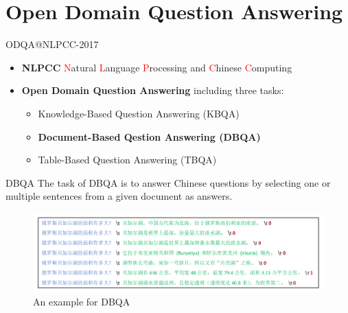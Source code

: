 \documentclass{beamer}
\begin{document}
  \section{Open Domain Question Answering}
  \begin{frame}{ODQA@NLPCC-2017}
    \begin{itemize}
    \item \textbf{NLPCC} \newline
    \textcolor{red}{N}atural \textcolor{red}{L}anguage \textcolor{red}{P}rocessing and \textcolor{red}{C}hinese \textcolor{red}{C}omputing \newline 
    \item \textbf{Open Domain Question Answering} \newline
    including three tasks:
      \begin{itemize}
        \item Knowledge-Based Question Answering (KBQA)
        \item \textbf{Document-Based Qestion Answering (DBQA)}
        \item Table-Based Question Answering (TBQA)
      \end{itemize}
    \end{itemize} 
  \end{frame}

  \begin{frame}{DBQA}
    The task of DBQA is to answer Chinese questions by selecting one or multiple sentences from a given document as answers. \newline
    \begin{center}
      \begin{figure}
      \includegraphics[width=\textwidth,height=\textheight,keepaspectratio]{dbqa-example.png}
      \caption{An example for DBQA}
      \end{figure}
    \end{center}
  \end{frame}
\end{document}
